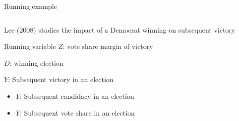 \documentclass[notes,11pt, aspectratio=169]{beamer}
\newenvironment{wideitemize}{\itemize\addtolength{\itemsep}{10pt}}{\enditemize}
\begin{document}
\begin{frame}{Running example}
    \begin{columns}[onlytextwidth, T] %
      \begin{column}{.5\textwidth}
        \begin{wideitemize}
        \item Lee (2008) studies the impact of a Democrat winning on subsequent victory
        \item Running variable $Z$: vote share margin of victory
        \item $D$: winning election
        \item $Y$: Subsequent victory in an election
          \begin{itemize}
          \item<2-> $Y$: Subsequent candidacy in an election
          \item<3-> $Y$: Subsequent vote share in an election             
          \end{itemize}
        \end{wideitemize}
      \end{column}%
      \hfill%
      \begin{column}{.5\textwidth}

\end{column}
\end{columns}
\end{frame}
\end{document}
